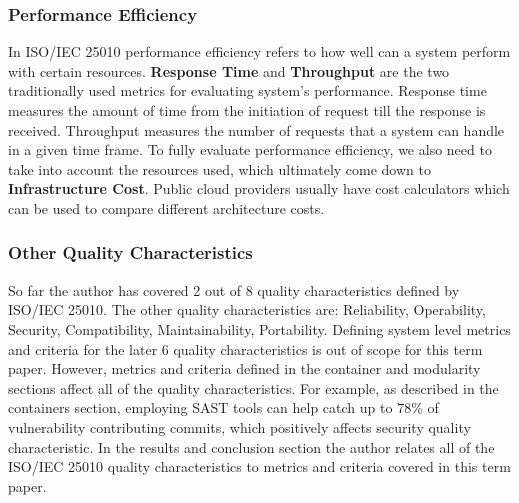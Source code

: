 \documentclass[12pt]{article}
\begin{document}
\subsubsection{Performance Efficiency}
In ISO/IEC 25010 performance efficiency refers to how well can a system perform with certain resources. \textbf{Response Time} and \textbf{Throughput} are the two traditionally used metrics for evaluating system's performance. Response time measures the amount of time from the initiation of request till the response is received. Throughput measures the number of requests that a system can handle in a given time frame. To fully evaluate performance efficiency, we also need to take into account the resources used, which ultimately come down to \textbf{Infrastructure Cost}. Public cloud providers usually have cost calculators which can be used to compare different architecture costs.
\subsubsection{Other Quality Characteristics}
So far the author has covered 2 out of 8 quality characteristics defined by ISO/IEC 25010. The other quality characteristics are: Reliability, Operability, Security, Compatibility, Maintainability, Portability. Defining system level metrics and criteria for the later 6 quality characteristics is out of scope for this term paper. However, metrics and criteria defined in the container and modularity sections affect all of the quality characteristics. For example, as described in the containers section, employing SAST tools can help catch up to 78\% of vulnerability contributing commits, which positively affects security quality characteristic. In the results and conclusion section the author relates all of the ISO/IEC 25010 quality characteristics to metrics and criteria covered in this term paper.
\newpage %

    
\end{document}
